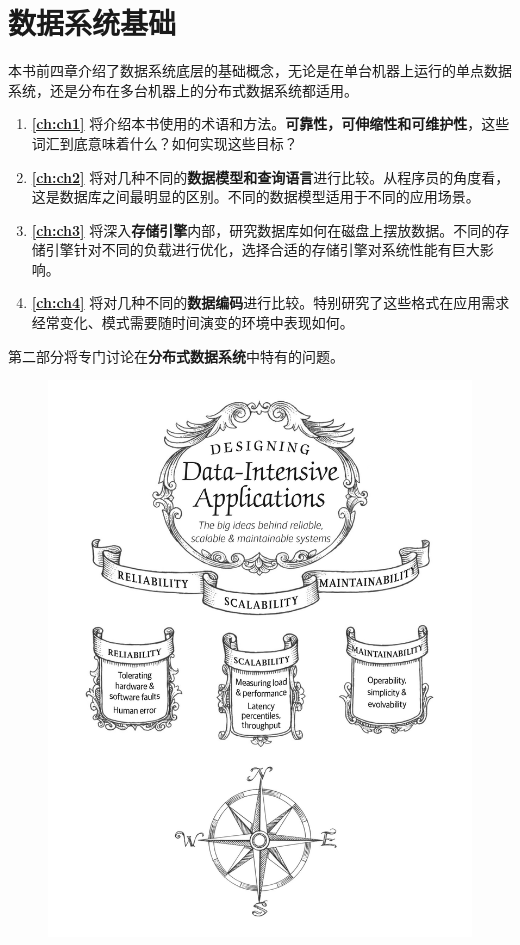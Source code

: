 \documentclass{book}
\begin{document}
\tableofcontents

\part{数据系统基础}
\label{part:part-1}
本书前四章介绍了数据系统底层的基础概念，无论是在单台机器上运行的单点数据系统，还是分布在多台机器上的分布式数据系统都适用。

\begin{enumerate}
  \item \textbf{\autoref{ch:ch1}} 将介绍本书使用的术语和方法。\textbf{可靠性，可伸缩性和可维护性}，这些词汇到底意味着什么？如何实现这些目标？
  \item \textbf{\autoref{ch:ch2}} 将对几种不同的\textbf{数据模型和查询语言}进行比较。从程序员的角度看，这是数据库之间最明显的区别。不同的数据模型适用于不同的应用场景。
  \item \textbf{\autoref{ch:ch3}} 将深入\textbf{存储引擎}内部，研究数据库如何在磁盘上摆放数据。不同的存储引擎针对不同的负载进行优化，选择合适的存储引擎对系统性能有巨大影响。
  \item \textbf{\autoref{ch:ch4}} 将对几种不同的\textbf{数据编码}进行比较。特别研究了这些格式在应用需求经常变化、模式需要随时间演变的环境中表现如何。
\end{enumerate}

第二部分将专门讨论在\textbf{分布式数据系统}中特有的问题。

\newpage
\begin{figure}
  \centering
  \includegraphics[width=\textwidth]{img/ch1.jpg}
  \label{fig:ch1}
\end{figure}
\end{document}
